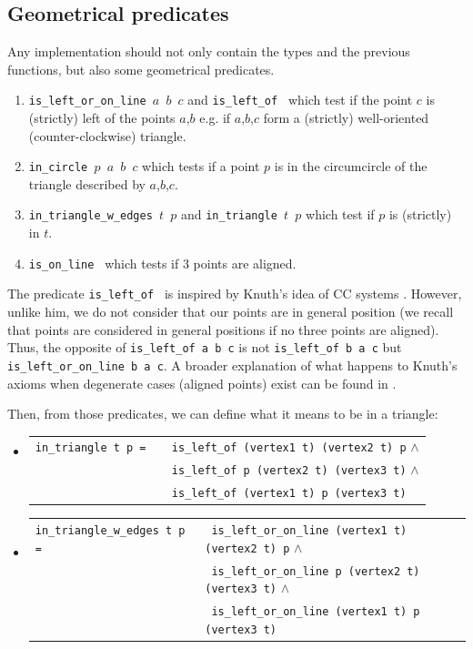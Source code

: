 \documentclass[a4paper,10pt]{article}
\def\ttt#1#2{{\tt{\color{black}#1} #2}}
\begin{document}
\subsection{Geometrical predicates}
\label{predicate}
Any implementation should not only contain the types and the previous functions, but also some geometrical predicates.
\begin{enumerate}
\item \ttt{is\_left\_or\_on\_line}{$a$ $b$ $c$} and \ttt{is\_left\_of}{} which test if the point $c$ is (strictly) left of the points $a$,$b$ e.g. if $a$,$b$,$c$ form a (strictly) well-oriented (counter-clockwise) triangle.
\item \ttt{in\_circle}{$p$ $a$ $b$ $c$} which tests if a point $p$ is in the circumcircle of the triangle described by $a$,$b$,$c$.
\item \ttt{in\_triangle\_w\_edges}{$t$ $p$} and \ttt{in\_triangle}{$t$ $p$} which test if $p$ is (strictly) in $t$.
  \item \ttt{is\_on\_line}{} which tests if 3 points are aligned.

\end{enumerate}

  The predicate \ttt{is\_left\_of}{} is inspired by Knuth's idea of CC systems \cite{Knuth92}.
  However, unlike him, we do not consider that our points are in general position (we recall that points are considered in general positions if no three points are aligned). Thus, the opposite of \ttt{is\_left\_of}{a b c} is not \ttt{is\_left\_of}{b a c} but \ttt{is\_left\_or\_on\_line}{b a c}. A broader explanation of what happens to Knuth's axioms when degenerate cases (aligned points) exist can be found in \cite{Hull}. \label{knuthpic}

  Then, from those predicates, we can define what it means to be in a triangle:
  \begin{itemize}
    \item \begin{tabular}{ll}
       \ttt {in\_triangle}{t p = }& \ttt{}{is\_left\_of (vertex1 t) (vertex2 t) p} $\wedge$\\
        &\ttt{}{is\_left\_of p (vertex2 t) (vertex3 t)} $\wedge$\\
  & \ttt{}{is\_left\_of (vertex1 t) p (vertex3 t)}
      \end{tabular}
\item \begin{tabular}{ll}
       \ttt{in\_triangle\_w\_edges t p}{= }& \ttt{}{is\_left\_or\_on\_line (vertex1 t) (vertex2 t) p} $\wedge$\\
        & \ttt{}{is\_left\_or\_on\_line p  (vertex2 t) (vertex3 t)} $\wedge$\\
  & \ttt{}{is\_left\_or\_on\_line (vertex1 t) p (vertex3 t)}
      \end{tabular}
      \end{itemize}
\end{document}
